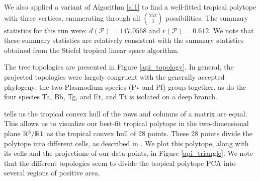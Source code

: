 \documentclass[12pt]{extarticle}
\numberwithin{theorem}{section}
\newcommand{\RR}{\mathbb{R}}
\begin{document}





We also applied a variant of Algorithm \ref{al1} to find a well-fitted tropical polytope with three vertices, enumerating through all ${\binom{252}{3}}$ possibilities. The summary statistics for this run were: $d(\mathcal P)= 147.0568$ and $r(\mathcal P) = 0.612$. We note that these summary statistics are relatively consistent with the summary statistics obtained from the Stiefel tropical linear space algorithm. 

The tree topologies are presented in Figure \ref{api_topology}. In general, the projected topologies were largely congruent with the generally accepted phylogeny: the two Plasmodium species (Pv and Pf) group together, as do the four species Ta, Bb, Tg, and Et, and Tt is isolated on a deep branch. 

\cite[Theorem 23]{DS} tells us the tropical convex hull of the rows and columns of a matrix are equal. This allows us to visualize our best-fit tropical polytope in the two-dimensional plane $\mathbb R^3/\RR {\bf 1}$ as the tropical convex hull of 28 points. These 28 points divide the polytope into different cells, as described in \cite[Example 9]{JSY}. We plot this polytope, along with its cells and the projections of our data points, in Figure \ref{api_triangle}.  We note that the different topologies seem to divide the tropical polytope PCA into several regions of positive area. 
\end{document}
